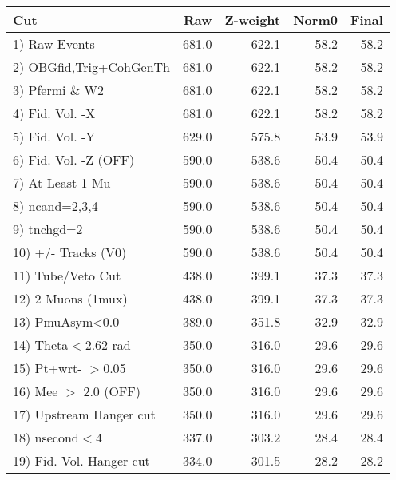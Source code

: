  \begin{table}[h!]\centering
 \begin{tabular}{||l||r|r|r|r||}
 \hline
 \hline
 Cut & Raw & Z-weight & Norm0 & Final \\
 \hline
  1) Raw Events           &       681.0 &       622.1 &        58.2 &        58.2 \\
  2) OBGfid,Trig+CohGenTh &       681.0 &       622.1 &        58.2 &        58.2 \\
  3) Pfermi \& W2         &       681.0 &       622.1 &        58.2 &        58.2 \\
  4) Fid. Vol. -X         &       681.0 &       622.1 &        58.2 &        58.2 \\
  5) Fid. Vol. -Y         &       629.0 &       575.8 &        53.9 &        53.9 \\
  6) Fid. Vol. -Z (OFF)   &       590.0 &       538.6 &        50.4 &        50.4 \\
  7) At Least 1 Mu        &       590.0 &       538.6 &        50.4 &        50.4 \\
  8) ncand=2,3,4          &       590.0 &       538.6 &        50.4 &        50.4 \\
  9) tnchgd=2             &       590.0 &       538.6 &        50.4 &        50.4 \\
 10) +/- Tracks (V0)      &       590.0 &       538.6 &        50.4 &        50.4 \\
 11) Tube/Veto Cut        &       438.0 &       399.1 &        37.3 &        37.3 \\
 12) 2 Muons (1mux)       &       438.0 &       399.1 &        37.3 &        37.3 \\
 13) PmuAsym<0.0          &       389.0 &       351.8 &        32.9 &        32.9 \\
 14) Theta$<$2.62 rad     &       350.0 &       316.0 &        29.6 &        29.6 \\
 15) Pt+wrt- $>$0.05      &       350.0 &       316.0 &        29.6 &        29.6 \\
 16) Mee $>$ 2.0  (OFF)   &       350.0 &       316.0 &        29.6 &        29.6 \\
 17) Upstream Hanger cut  &       350.0 &       316.0 &        29.6 &        29.6 \\
 18) nsecond$<$4          &       337.0 &       303.2 &        28.4 &        28.4 \\
 19) Fid. Vol. Hanger cut &       334.0 &       301.5 &        28.2 &        28.2 \\

\end{tabular}
\end{table}
